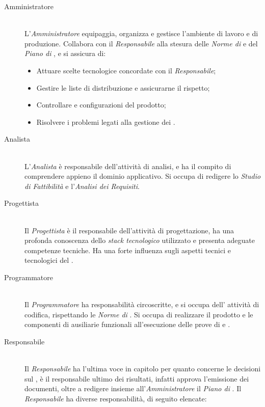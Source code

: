 \begin{description}

\item[Amministratore] \hfill \\ L'\textit{Amministratore} equipaggia, organizza e gestisce l'ambiente di lavoro e di produzione. Collabora con il \textit{Responsabile} alla stesura delle \textit{Norme di } e del \textit{Piano di }, e si assicura di:
  \begin{itemize}

  \item Attuare scelte tecnologice concordate con il \textit{Responsabile};
  \item Gestire le liste di distribuzione e assicurarne il rispetto;
  \item Controllare  e configurazioni del prodotto;
  \item Risolvere i problemi legati alla gestione dei .
    
  \end{itemize}

\item[Analista] \hfill \\ L'\textit{Analista} \`e responsabile dell'attivit\`a di analisi, e ha il compito di comprendere appieno il dominio applicativo. Si occupa di redigere lo \textit{Studio di Fattibilit\`a} e l'\textit{Analisi dei Requisiti}.

\item[Progettista] \hfill \\ Il \textit{Progettista} \`e il responsabile dell'attivit\`a di progettazione, ha una profonda conoscenza dello \textit{stack tecnologico} utilizzato e presenta adeguate competenze tecniche. Ha una forte influenza sugli aspetti tecnici e tecnologici del .

\item[Programmatore] \hfill \\ Il \textit{Programmatore} ha responsabilit\`a circoscritte, e si occupa dell' attivit\`a di codifica, rispettando le \textit{Norme di }. Si occupa di realizzare il prodotto e le componenti di ausiliarie funzionali all'esecuzione delle prove di  e .

\item[Responsabile] \hfill \\ Il \textit{Responsabile} ha l'ultima voce in capitolo per quanto concerne le decisioni sul , \`e il responsabile ultimo dei risultati, infatti approva l'emissione dei documenti, oltre a redigere insieme all'\textit{Amministratore} il \textit{Piano di }. Il \textit{Responsabile} ha diverse responsabilit\`a, di seguito elencate:
  \begin{itemize}


\end{itemize}
\end{description}
